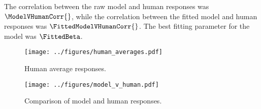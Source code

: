 \documentclass[12pt]{article}
\begin{document}
The correlation between the raw model and human responses was $\ModelVHumanCorr{}$, while the correlation between the fitted model and human responses was $\FittedModelVHumanCorr{}$. The best fitting parameter for the model was $\FittedBeta$.

\begin{figure}
    \begin{center}
    \texttt{[image: ../figures/human\_averages.pdf]}
    \caption{Human average responses.}
    \end{center}
\end{figure}

\begin{figure}
    \begin{center}
    \texttt{[image: ../figures/model\_v\_human.pdf]}
    \caption{Comparison of model and human responses.}
    \end{center}
\end{figure}
\end{document}
